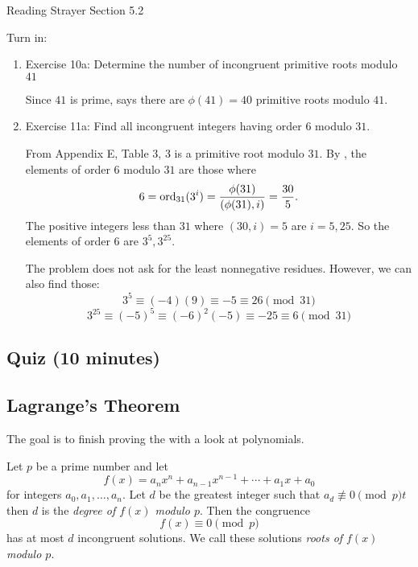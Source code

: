 \documentclass[letterpaper, 11 pt]{ximera}
\theoremstyle{definition}
\begin{document}
\begin{pre}
    \item[Reading] Strayer Section 5.2
    \item[Turn in:] 
    
    \begin{enumerate}
        \item Exercise 10a: Determine the number of incongruent primitive roots modulo $41$
        \begin{solution}
            Since $41$ is prime,  says there are $\phi(41)=40$ primitive roots modulo $41.$
        \end{solution}
        \item Exercise 11a: Find all incongruent integers having order $6$ modulo $31.$
        \begin{solution}
                From Appendix E, Table 3, $3$ is a primitive root modulo $31.$ By , the elements of order $6$ modulo $31$ are those where \[6=\operatorname{ord}_{31}(3^i)=\frac{\phi(31)}{(\phi(31),i)}=\frac{30}{5}.\] The positive integers less than $31$ where $(30,i)=5$ are $i=5,25.$ So the elements of order $6$ are $3^5, 3^{25}.$
                

                The problem does not ask for the least nonnegative residues. However, we can also find those:
                    \[
                        3^5\equiv (-4)(9)\equiv -5\equiv 26\pmod{31}
                    \]
                    \[
                        3^{25}\equiv (-5)^{5}\equiv (-6)^2(-5)\equiv -25\equiv 6\pmod{31}
                    \]
            \end{solution}
    \end{enumerate}
\end{pre}

\subsection{Quiz (10 minutes)}
\subsection{Lagrange's Theorem}
    The goal is to finish proving the  with a look at polynomials.

    \begin{thm*}\label{thm:lagrange}
        Let $p$ be a prime number and let 
        \[f(x)=a_n x^n +a_{n-1} x^{n-1}+\cdots +a_1 x+a_0\]
        for integers $a_0,a_1,\dots,a_n.$ Let $d$ be the greatest integer such that $a_d\not\equiv 0\pmod{p}t$ then $d$ is the \emph{degree of $f(x)$ modulo $p.$}
        Then the congruence 
        \[f(x)\equiv 0\pmod{p}\]
        has at most $d$ incongruent solutions. We call these solutions \emph{roots of $f(x)$ modulo $p.$}
    \end{thm*}
\end{document}

